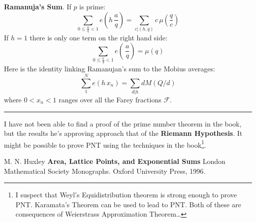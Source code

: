 \documentclass[12pt]{article}
\begin{document}
\newpage

\noindent \textbf{Ramanuja's Sum}.  If $p$ is prime:
$$ \sum_{0 \leq \frac{a}{q} < 1} e\left( h \, \frac{a}{q} \right) = \sum_{ c | (h,q)} c\,  \mu \left(\frac{q}{c}\right)$$
If $h=1$ there is only one term on the right hand side:
$$ \sum_{0 \leq \frac{a}{q} < 1} e\left(  \, \frac{a}{q} \right) = \mu(q)$$
Here is the identity linking Ramanujan's sum to the Mobius averages:
$$ \sum_1^N e( h \, x_n) =  \sum_{d | h} d M(Q/d) $$
where $0 < x_n < 1$ ranges over all the Farey fractions $\mathcal{F}$. \vspace{12pt} \hrule \vspace{12pt}
\noindent I have not been able to find a proof of the prime number theorem in the book, but the results he's approving approach that of the \textbf{Riemann Hypothesis}.  It might be possible to prove PNT using the techniques in the book\footnote{I suspect that Weyl's Equidistribution theorem is strong enough to prove PNT.  Karamata's Theorem can be used to lead to PNT.  Both of these are consequences of Weierstrass Approximation Theorem\dots}.

\selectfont \fontsize{12}{10}\selectfont

\begin{thebibliography}{}

\item M. N. Huxley \textbf{Area, Lattice Points, and Exponential Sums} London Mathematical Society Monographs.  Oxford University Press, 1996.


\end{thebibliography}
\end{document}
